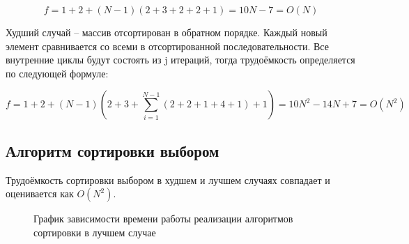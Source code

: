             \begin{equation}
                f = 1 + 2 + (N-1)(2 + 3 + 2 + 2 + 1) = 10N - 7 = O(N)
            \end{equation}

            Худший случай -- массив отсортирован в обратном порядке. 
            Каждый новый элемент сравнивается со всеми в отсортированной последовательности.
            Все внутренние циклы будут состоять из j итераций, тогда
            трудоёмкость определяется по следующей формуле:

            \begin{equation}
                f = 1 + 2 + (N-1)(2 + 3 + \sum_{i=1}^{N-1} (2 + 2 + 1 + 4 + 1) + 1) = 10N^2 - 14N + 7 = O(N^2)
            \end{equation}

        \subsection{Алгоритм сортировки выбором}
            Трудоёмкость сортировки выбором в худшем и лучшем случаях совпадает
            и оценивается как $ O(N^2) $.       

    \begin{figure}[h!]
        \centering
        \caption{График зависимости времени работы реализации алгоритмов сортировки в лучшем случае} 
        \label{graph:test:best}
    \end{figure}

